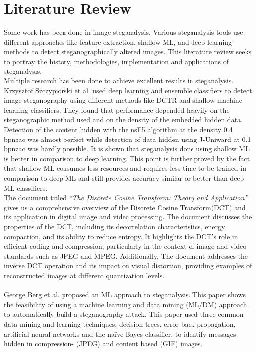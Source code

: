 \chapter{Literature Review} 
Some work has been done in image steganalysis. Various steganalysis tools use different approaches like feature extraction, shallow ML, and deep learning methods to detect steganographically altered images. This literature review seeks to portray the history, methodologies, implementation and applications of steganalysis.\\
Multiple research has been done to achieve excellent results in steganalysis. Krzysztof Szczypiorski et al.\cite{1} used deep learning and ensemble classifiers to detect image steganography using different methods like DCTR and shallow machine learning classifiers. They found that performance depended heavily on the steganographic method used and on the density of the embedded hidden data. Detection of the content hidden with the nsF5 algorithm at the density 0.4 bpnzac was almost perfect while detection of data hidden using J-Uniward at 0.1 bpnzac was hardly possible. It is shown that steganalysis done using shallow ML is better in comparison to deep learning. This point is further proved by the fact that shallow ML consumes less resources and requires less time to be trained in comparison to deep ML and still provides accuracy similar or better than deep ML classifiers. \\
The document titled \textit{``The Discrete Cosine Transform: Theory and Application''}\cite{4} gives us a comprehensive overview of the Discrete Cosine Transform(DCT) and its application in digital image and video processing. The document discusses the properties of the DCT, including its decorrelation characteristics, energy compaction, and its ability to reduce entropy. It highlights the DCT's role in efficient coding and compression, particularly in the context of image and video standards such as JPEG and MPEG. Additionally, The document addresses the inverse DCT operation and its impact on visual distortion, providing examples of reconstructed images at different quantization levels.\\
\\George Berg et al.\cite{2} proposed an ML approach to steganalysis. This paper shows the feasibility of using a machine learning and data mining (ML/DM) approach to automatically build a steganography attack. This paper used three common data mining and learning techniques: decision trees, error back-propagation, artificial neural networks and the naïve Bayes classifier, to identify messages hidden in compression- (JPEG) and content based (GIF) images.\\
